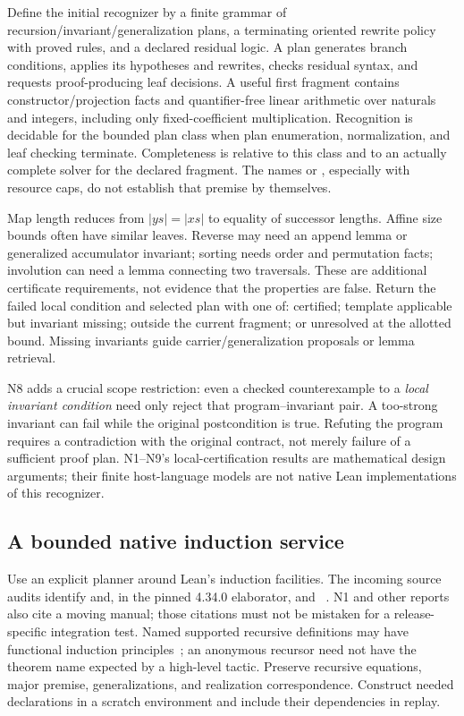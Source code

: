 Define the initial recognizer by a finite grammar of recursion/invariant/generalization plans, a terminating oriented rewrite policy with proved rules, and a declared residual logic. A plan generates branch conditions, applies its hypotheses and rewrites, checks residual syntax, and requests proof-producing leaf decisions. A useful first fragment contains constructor/projection facts and quantifier-free linear arithmetic over naturals and integers, including only fixed-coefficient multiplication. Recognition is decidable for the bounded plan class when plan enumeration, normalization, and leaf checking terminate. Completeness is relative to this class and to an actually complete solver for the declared fragment. The names  or , especially with resource caps, do not establish that premise by themselves.

Map length reduces from $|ys|=|xs|$ to equality of successor lengths. Affine size bounds often have similar leaves. Reverse may need an append lemma or generalized accumulator invariant; sorting needs order and permutation facts; involution can need a lemma connecting two traversals. These are additional certificate requirements, not evidence that the properties are false. Return the failed local condition and selected plan with one of: certified; template applicable but invariant missing; outside the current fragment; or unresolved at the allotted bound. Missing invariants guide carrier/generalization proposals or lemma retrieval.

N8 adds a crucial scope restriction: even a checked counterexample to a \emph{local invariant condition} need only reject that program--invariant pair. A too-strong invariant can fail while the original postcondition is true. Refuting the program requires a contradiction with the original contract, not merely failure of a sufficient proof plan. N1--N9's local-certification results are mathematical design arguments; their finite host-language models are not native Lean implementations of this recognizer.

\subsection{A bounded native induction service}\label{sec:contract-induction-service}

Use an explicit planner around Lean's induction facilities. The incoming source audits identify  and, in the pinned 4.34.0 elaborator,  and ~\cite{leaninduction,leanfuninduction}. N1 and other reports also cite a moving manual; those citations must not be mistaken for a release-specific integration test. Named supported recursive definitions may have functional induction principles~\cite{lean418}; an anonymous recursor need not have the theorem name expected by a high-level tactic. Preserve recursive equations, major premise, generalizations, and realization correspondence. Construct needed declarations in a scratch environment and include their dependencies in replay.

